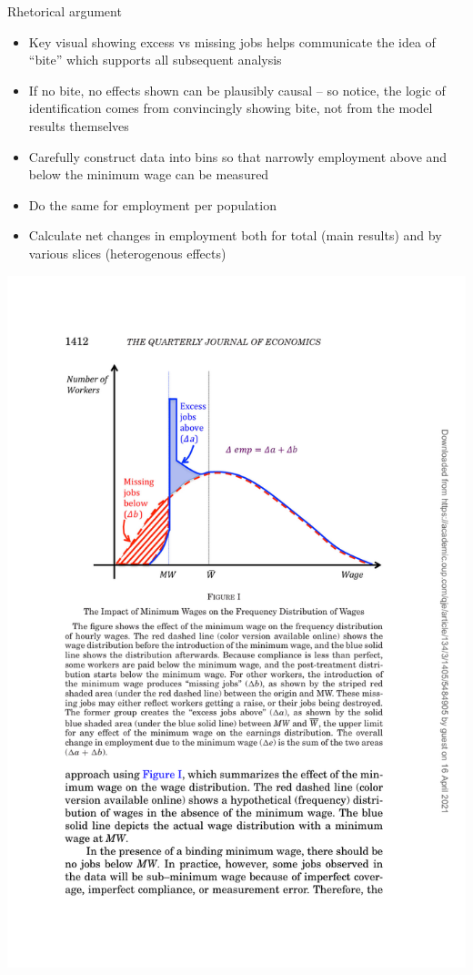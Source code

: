 \documentclass{beamer}
\begin{document}
\begin{frame}{Rhetorical argument}

\begin{itemize}
\item Key visual showing excess vs missing jobs helps communicate the idea of ``bite'' which supports all subsequent analysis
\item If no bite, no effects shown can be plausibly causal -- so notice, the logic of identification comes from convincingly showing bite, not from the model results themselves
\item Carefully construct data into bins so that narrowly employment above and below the minimum wage can be measured
\item Do the same for employment per population
\item Calculate net changes in employment both for total (main results) and by various slices (heterogenous effects)
\end{itemize}

\end{frame}

\includegraphics{./lecture_includes/dube_a.pdf}
\end{document}
